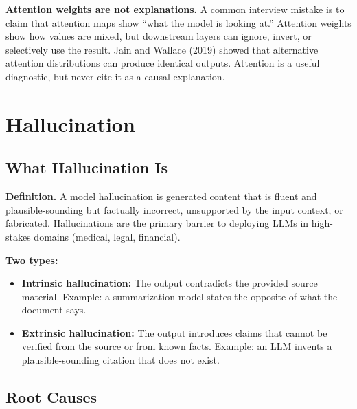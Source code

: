 \begin{warningbox}
\textbf{Attention weights are not explanations.} A common interview mistake is to claim that attention maps show ``what the model is looking at.'' Attention weights show how values are mixed, but downstream layers can ignore, invert, or selectively use the result. Jain and Wallace (2019) showed that alternative attention distributions can produce identical outputs. Attention is a useful diagnostic, but never cite it as a causal explanation.
\end{warningbox}

\section{Hallucination}
\label{sec:hallucination}

\subsection{What Hallucination Is}

\textbf{Definition.} A model hallucination is generated content that is fluent and plausible-sounding but factually incorrect, unsupported by the input context, or fabricated. Hallucinations are the primary barrier to deploying LLMs in high-stakes domains (medical, legal, financial).

\textbf{Two types:}
\begin{itemize}
    \item \textbf{Intrinsic hallucination:} The output contradicts the provided source material. Example: a summarization model states the opposite of what the document says.
    \item \textbf{Extrinsic hallucination:} The output introduces claims that cannot be verified from the source or from known facts. Example: an LLM invents a plausible-sounding citation that does not exist.
\end{itemize}

\subsection{Root Causes}

